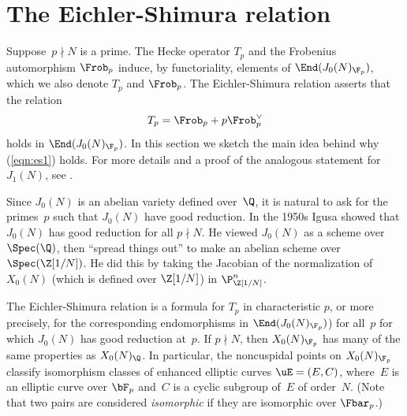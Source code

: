 \documentclass{report}
\begin{document}
\section{The Eichler-Shimura relation}\label{sec:eichler-shimura}
Suppose~$p\nmid N$ is a prime.  The Hecke operator $T_p$ and the
Frobenius automorphism $\Frob_p$ induce, by functoriality, elements of
$\End(J_0(N)_{\F_p})$, which we also denote $T_p$ and $\Frob_p$.  The
Eichler-Shimura relation asserts that the relation
\begin{equation}\label{eqn:es1}
   T_p = \Frob_p + p\Frob_p^{\vee}
\end{equation}
holds in $\End(J_0(N)_{\F_p})$.  In this section we sketch the main
idea behind why (\ref{eqn:es1}) holds.  For more details and a proof
of the analogous statement for $J_1(N)$, see
\cite{conrad:shimura}.

Since $J_0(N)$ is an abelian variety defined over~$\Q$, it is natural
to ask for the primes~$p$ such that $J_0(N)$ have good reduction.  In
the 1950s Igusa showed  that
$J_0(N)$ has good reduction for all $p\nmid{}N$.  He viewed $J_0(N)$
as a scheme over $\Spec(\Q)$, then ``spread things out'' to make an
abelian scheme over $\Spec(\Z[1/N])$.  He did this by taking the
Jacobian of the normalization of
$X_0(N)$ (which is defined over $\Z[1/N]$) in $\P^n_{\Z[1/N]}$.

The Eichler-Shimura relation is a formula for
$T_p$ in characteristic $p$, or more precisely, for the corresponding
endomorphisms in $\End(J_0(N)_{\F_p})$) for all~$p$ for which $J_0(N)$
has good reduction at~$p$. If $p\nmid N$, then $X_0(N)_{\F_p}$ has
many of the same properties as $X_0(N)_{\Q}$.  In particular, the
noncuspidal points on $X_0(N)_{\F_p}$ classify isomorphism classes of
enhanced elliptic curves $\uE=(E,C)$, where~$E$ is an elliptic curve
over $\bF_p$ and~$C$ is a cyclic subgroup of~$E$ of order~$N$.  (Note
that two pairs are considered {\em isomorphic} if they are isomorphic
over $\Fbar_p$.)
\end{document}
